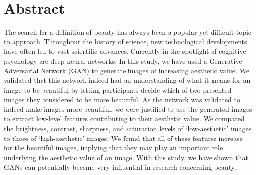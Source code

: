 \documentclass[../main.tex]{subfiles}
\begin{document}
\newpage
\section{Abstract}
The search for a definition of beauty has always been a popular yet difficult topic to approach. Throughout the history of science, new technological developments have often led to vast scientific advances. Currently in the spotlight of cognitive psychology are deep neural networks. In this study, we have used a Generative Adversarial Network (GAN) to generate images of increasing aesthetic value. We validated that this network indeed had an understanding of what it means for an image to be beautiful by letting participants decide which of two presented images they considered to be more beautiful. As the network was validated to indeed make images more beautiful, we were justified to use the generated images to extract low-level features contributing to their aesthetic value. We compared the brightness, contrast, sharpness, and saturation levels of `low-aesthetic' images to those of `high-aesthetic' images. We found that all of these features increase for the beautiful images, implying that they may play an important role underlying the aesthetic value of an image. With this study, we have shown that GANs can potentially become very influential in research concerning beauty.
\end{document}
